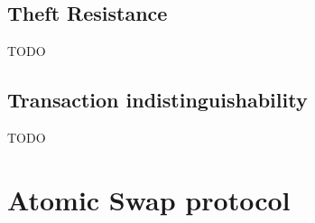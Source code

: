 \subsection{Theft Resistance} \label{subsec:atom:prf-theft-resistance}

TODO

\subsection{Transaction indistinguishability} \label{subsec:atom:prf-tx-indistinguishability}

TODO

\section{Atomic Swap protocol}\label{sec:atom:atomic-swap}

